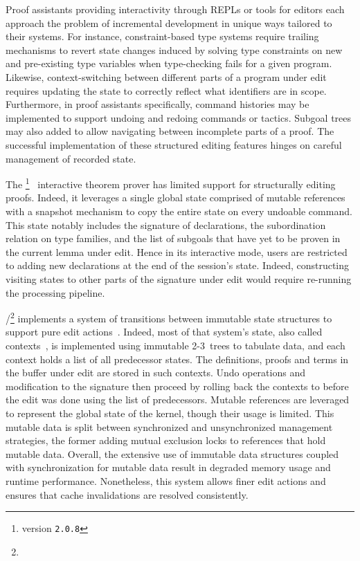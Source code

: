 Proof assistants providing interactivity through \acp{REPL} or tools for editors each approach the problem of incremental development in unique ways tailored to their systems.
For instance, constraint-based type systems require trailing mechanisms to revert state changes induced by solving type constraints on new and pre-existing type variables when type-checking fails for a given program.
Likewise, context-switching between different parts of a program under edit requires updating the state to correctly reflect what identifiers are in scope.
Furthermore, in proof assistants specifically, command histories may be implemented to support undoing and redoing commands or tactics.
Subgoal trees may also added to allow navigating between incomplete parts of a proof.
The successful implementation of these structured editing features hinges on careful management of recorded state.

The \Abella\footnote{\Abella version \texttt{2.0.8}}~\cite{baelde2014abella} interactive theorem prover has limited support for structurally editing proofs.
Indeed, it leverages a single global state comprised of mutable references with a snapshot mechanism to copy the entire state on every undoable command.
This state notably includes the signature of declarations, the subordination relation on type families, and the list of subgoals that have yet to be proven in the current lemma under edit.
Hence in its interactive mode, \Abella users are restricted to adding new declarations at the end of the session's state.
Indeed, constructing visiting states to other parts of the signature under edit would require re-running the processing pipeline.

\Isabelle/\Isar\footnote{} implements a system of transitions between immutable state structures to support pure edit actions~\cite{wenzel2023isabelleimpl, wenzel2023isabelleisarref, wenzel2023isabellesys}.
Indeed, most of that system's state, also called contexts~\cite{ballarin2006interpretation}, is implemented using immutable 2-3~trees to tabulate data, and each context holds a list of all predecessor states.
The definitions, proofs and terms in the buffer under edit are stored in such contexts.
Undo operations and modification to the signature then proceed by rolling back the contexts to before the edit was done using the list of predecessors.
Mutable references are leveraged to represent the global state of the kernel, though their usage is limited.
This mutable data is split between synchronized and unsynchronized management strategies, the former adding mutual exclusion locks to references that hold mutable data.
Overall, the extensive use of immutable data structures coupled with synchronization for mutable data result in degraded memory usage and runtime performance.
Nonetheless, this system allows finer edit actions and ensures that cache invalidations are resolved consistently.

